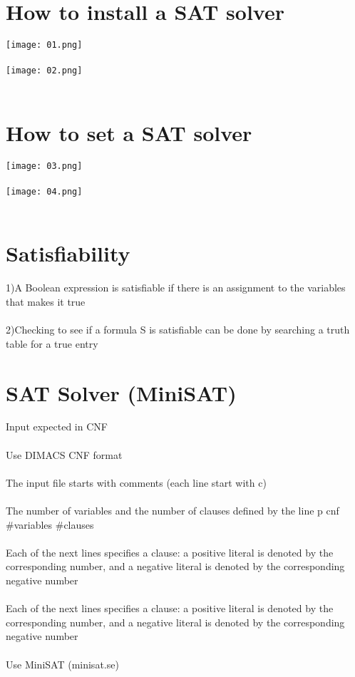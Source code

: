\documentclass{article}
\begin{document}
\section{    How to install a SAT solver
}
\texttt{[image: 01.png]} \\
\\
\texttt{[image: 02.png]}\\
\\
\section{How to set a SAT solver}
\texttt{[image: 03.png]} \\
\\
\texttt{[image: 04.png]}\\
\\
\section{Satisfiability}
1)A Boolean expression is satisfiable if there is an assignment to the variables that makes it true
\\ \\
2)Checking to see if a formula S is satisfiable can be done by searching a truth table for a true entry

\section{SAT Solver (MiniSAT)}
Input expected in CNF
\\ \\
Use DIMACS CNF format
\\ \\
   The input file starts with comments (each line start with c)
\\ \\
      The number of variables and the number of clauses defined by the line p cnf \#variables \#clauses
\\ \\
      Each of the next lines specifies a clause: a positive literal is denoted by the corresponding number, and a negative literal is denoted by the corresponding negative number
\\ \\
    Each of the next lines specifies a clause: a positive literal is denoted by the corresponding number, and a negative literal is denoted by the corresponding negative number
\\ \\
Use MiniSAT (minisat.se)
\\ \\
\end{document}
